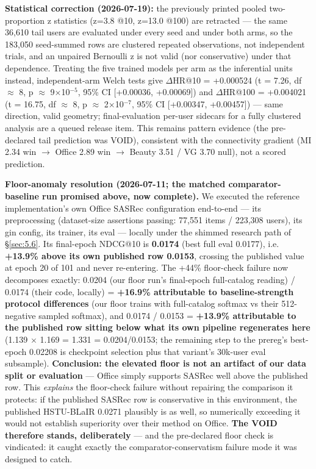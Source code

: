 \textbf{Statistical correction (2026-07-19):} the previously printed pooled two-proportion z statistics (z=3.8 @10, z=13.0 @100) are retracted --- the same 36,610 tail users are evaluated under every seed and under both arms, so the 183,050 seed-summed rows are clustered repeated observations, not independent trials, and an unpaired Bernoulli z is not valid (nor conservative) under that dependence. Treating the five trained models per arm as the inferential units instead, independent-arm Welch tests give \ensuremath{\Delta}HR@10 = +0.000524 (t = 7.26, df \ensuremath{\approx} 8, p \ensuremath{\approx} 9\ensuremath{\times}10$^{-5}$, 95\% CI {[}+0.00036, +0.00069{]}) and \ensuremath{\Delta}HR@100 = +0.004021 (t = 16.75, df \ensuremath{\approx} 8, p \ensuremath{\approx} 2\ensuremath{\times}10$^{-7}$, 95\% CI {[}+0.00347, +0.00457{]}) --- same direction, valid geometry; final-evaluation per-user sidecars for a fully clustered analysis are a queued release item. This remains pattern evidence (the pre-declared tail prediction was VOID), consistent with the connectivity gradient (MI 2.34 win \ensuremath{\rightarrow} Office 2.89 win \ensuremath{\rightarrow} Beauty 3.51 / VG 3.70 null), not a scored prediction.



\textbf{Floor-anomaly resolution (2026-07-11; the matched comparator-baseline run promised above, now complete).} We executed the reference implementation's own Office SASRec configuration end-to-end --- its preprocessing (dataset-size assertions passing: 77,551 items / 223,308 users), its gin config, its trainer, its eval --- locally under the shimmed research path of \S\ref{sec:5.6}. Its final-epoch NDCG@10 is \textbf{0.0174} (best full eval 0.0177), i.e. \textbf{+13.9\% above its own published row 0.0153}, crossing the published value at epoch 20 of 101 and never re-entering. The +44\% floor-check failure now decomposes exactly: 0.0204 (our floor run's final-epoch full-catalog reading) / 0.0174 (their code, locally) = \textbf{+16.9\% attributable to baseline-strength protocol differences} (our floor trains with full-catalog softmax vs their 512-negative sampled softmax), and 0.0174 / 0.0153 = \textbf{+13.9\% attributable to the published row sitting below what its own pipeline regenerates here} (1.139 \ensuremath{\times} 1.169 = 1.331 = 0.0204/0.0153; the remaining step to the prereg's best-epoch 0.02208 is checkpoint selection plus that variant's 30k-user eval subsample). \textbf{Conclusion: the elevated floor is not an artifact of our data split or evaluation} --- Office simply supports SASRec well above the published row. This \emph{explains} the floor-check failure without repairing the comparison it protects: if the published SASRec row is conservative in this environment, the published HSTU-BLaIR 0.0271 plausibly is as well, so numerically exceeding it would not establish superiority over their method on Office. \textbf{The VOID therefore stands, deliberately} --- and the pre-declared floor check is vindicated: it caught exactly the comparator-conservatism failure mode it was designed to catch.

